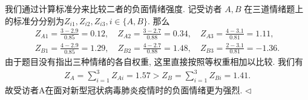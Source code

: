 \documentclass[11pt]{article}
\newenvironment{answer}[1][Solution]{\begin{trivlist}
\item[\hskip \labelsep {\bfseries #1.}\hskip \labelsep]}{\hfill$\lhd$\end{trivlist}}
\newcommand\1{\mathds{1}}
\begin{document}
\begin{answer}
    我们通过计算标准分来比较二者的负面情绪强度. 记受访者 $A,B$ 在三道情绪题上的标准分分别为$Z_{i1}, Z_{i2}, Z_{i3}, i\in\{A, B\}$. 那么
    \begin{align*}
        Z_{A1} = \frac{3-2.9}{0.85} = 0.12, \quad Z_{A2} = \frac{3-2.7}{0.88} = 0.34, \quad Z_{A3} = \frac{4-3.1}{0.81} = 1.11, \\
        Z_{B1} = \frac{4-2.9}{0.85} = 1.29, \quad Z_{B2} = \frac{4-2.7}{0.88} = 1.48, \quad Z_{B3} = \frac{2-3.1}{0.81} = -1.36.
    \end{align*}
    由于题目没有指出三种情绪的各自权重, 这里直接按照等权重相加以比较. 我们有
    \begin{align*}
        Z_A = \sum_{i=1}^{3}Z_{Ai} = 1.57 > Z_B = \sum_{i=1}^{3}Z_{Bi} = 1.41.
    \end{align*}
    故受访者A在面对新型冠状病毒肺炎疫情时的负面情绪更为强烈.
\end{answer}
\end{document}
